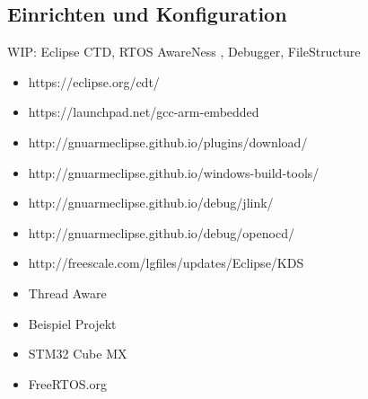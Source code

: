 \subsection{Einrichten und Konfiguration}
\label{sec:Einrichtung und Konfiguration}
WIP: Eclipse CTD, RTOS AwareNess , Debugger, FileStructure
\begin{itemize}
	\item https://eclipse.org/cdt/
	\item https://launchpad.net/gcc-arm-embedded
\item http://gnuarmeclipse.github.io/plugins/download/
\item http://gnuarmeclipse.github.io/windows-build-tools/
\item http://gnuarmeclipse.github.io/debug/jlink/
\item http://gnuarmeclipse.github.io/debug/openocd/
\item http://freescale.com/lgfiles/updates/Eclipse/KDS
\item Thread Aware 
\item Beispiel Projekt
\item STM32 Cube MX
\item FreeRTOS.org
\end{itemize}